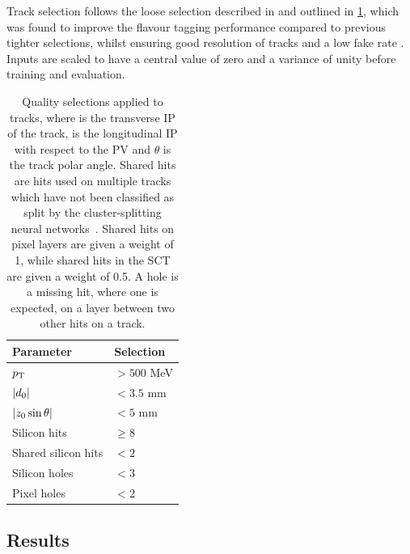 Track selection follows the loose selection described in  and outlined in \cref{tab:fake_track_mva_selections}, which was found to improve the flavour tagging performance compared to previous tighter selections, whilst ensuring good resolution of tracks and a low fake rate \cite{PERF-2015-08}.
Inputs are scaled to have a central value of zero and a variance of unity before training and evaluation.

\begin{table}[!htbp]
  \footnotesize\centering
  \setlength{\tabcolsep}{0.5em} %
  \begin{tabular}{ll}
    \toprule\hline
    \textbf{Parameter} & \textbf{Selection} \\
    \hline
    $p_{\text{T}}$                & $> 500$ MeV \\
    $|d_{0}|$              & $< 3.5$ mm \\
    $|z_{0}\sin\theta|$   & $< 5$ mm \\
    Silicon hits         & $\ge 8$ \\
    Shared silicon hits  & $< 2$ \\
    Silicon holes        & $< 3$ \\
    Pixel holes          & $< 2$ \\
    \hline\bottomrule
  \end{tabular}
  \caption{
    Quality selections applied to tracks,
    where \dzero is the transverse IP of the track, \zzero is the longitudinal IP with respect to the PV and $\theta$ is the track polar angle.
    Shared hits are hits used on multiple tracks which have not been classified as split by the cluster-splitting neural networks~\cite{PERF-2015-08}.
    Shared hits on pixel layers are given a weight of 1, while shared hits in the SCT are given a weight of 0.5.
    A hole is a missing hit, where one is expected, on a layer between two other hits on a track.
    }
  \vspace{4mm}
  \label{tab:fake_track_mva_selections}
\end{table}




\subsection{Results}\label{sec:fake_track_mva_results}


